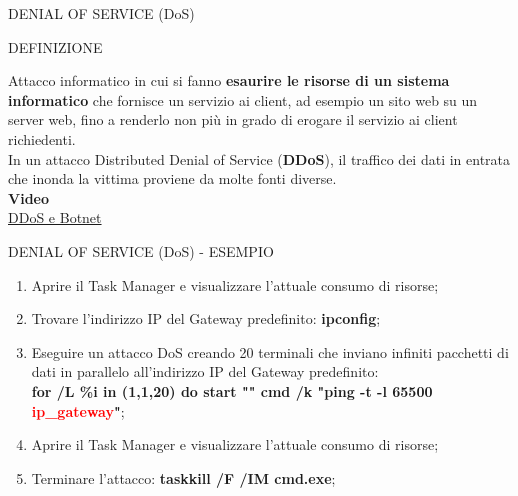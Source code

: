 \documentclass[aspectratio=1610, handout]{beamer}
\begin{document}
\begin{frame}{DENIAL OF SERVICE (DoS)}
    \begin{alertblock}{DEFINIZIONE}
        \begin{minipage}{0.98\linewidth}
            \justifying
            Attacco informatico in cui si fanno \textbf{esaurire le risorse di un sistema informatico} 
            che fornisce un servizio ai client, ad esempio un sito web su un server web, 
            fino a renderlo non più in grado di erogare il servizio ai client richiedenti.\\
            In un attacco Distributed Denial of Service (\textbf{DDoS}), il traffico dei dati in entrata 
            che inonda la vittima proviene da molte fonti diverse.\\
            \bigskip
            \tiny{\textbf{Video}}\\
            \tiny{\href{https://www.youtube.com/watch?v=ilhGh9CEIwM}{DDoS e Botnet}}
        \end{minipage}
    \end{alertblock}
\end{frame}

\begin{frame}{DENIAL OF SERVICE (DoS) - ESEMPIO}
    \begin{enumerate}
        \item Aprire il Task Manager e visualizzare l’attuale consumo di risorse;
        \pause
        \item Trovare l'indirizzo IP del Gateway predefinito: \textbf{ipconfig};
        \pause
        \item Eseguire un attacco DoS creando 20 terminali che inviano infiniti pacchetti di dati in parallelo 
        all'indirizzo IP del Gateway predefinito:\\ 
        \textbf{for /L \%i in (1,1,20) do start "" cmd /k "ping -t -l 65500 \textcolor{red}{ip\_gateway}"};
        \pause
        \item Aprire il Task Manager e visualizzare l’attuale consumo di risorse;
        \pause
        \item Terminare l'attacco: \textbf{taskkill /F /IM cmd.exe};
    \end{enumerate}                        
\end{frame}
\end{document}
